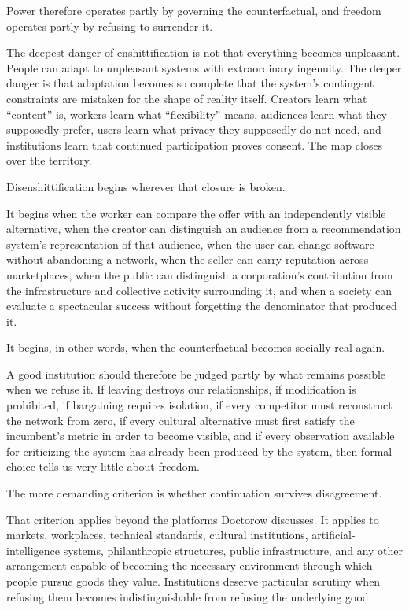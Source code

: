 \documentclass[11pt]{article}
\begin{document}
Power therefore operates partly by governing the counterfactual, and freedom operates partly by refusing to surrender it.

The deepest danger of enshittification is not that everything becomes unpleasant. People can adapt to unpleasant systems with extraordinary ingenuity. The deeper danger is that adaptation becomes so complete that the system's contingent constraints are mistaken for the shape of reality itself. Creators learn what ``content'' is, workers learn what ``flexibility'' means, audiences learn what they supposedly prefer, users learn what privacy they supposedly do not need, and institutions learn that continued participation proves consent. The map closes over the territory.

Disenshittification begins wherever that closure is broken.

It begins when the worker can compare the offer with an independently visible alternative, when the creator can distinguish an audience from a recommendation system's representation of that audience, when the user can change software without abandoning a network, when the seller can carry reputation across marketplaces, when the public can distinguish a corporation's contribution from the infrastructure and collective activity surrounding it, and when a society can evaluate a spectacular success without forgetting the denominator that produced it.

It begins, in other words, when the counterfactual becomes socially real again.

A good institution should therefore be judged partly by what remains possible when we refuse it. If leaving destroys our relationships, if modification is prohibited, if bargaining requires isolation, if every competitor must reconstruct the network from zero, if every cultural alternative must first satisfy the incumbent's metric in order to become visible, and if every observation available for criticizing the system has already been produced by the system, then formal choice tells us very little about freedom.

The more demanding criterion is whether continuation survives disagreement.

That criterion applies beyond the platforms Doctorow discusses. It applies to markets, workplaces, technical standards, cultural institutions, artificial-intelligence systems, philanthropic structures, public infrastructure, and any other arrangement capable of becoming the necessary environment through which people pursue goods they value. Institutions deserve particular scrutiny when refusing them becomes indistinguishable from refusing the underlying good.
\end{document}
